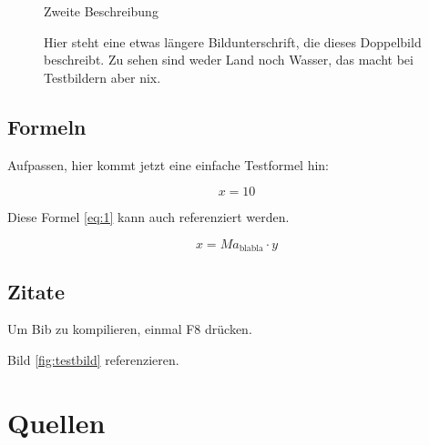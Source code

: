\documentclass[
12pt, %
toc=listofnumbered, %
toc=chapterentrydotfill, %
numbers=noenddot, %
captions=tableheading, %
]{scrreprt}
\let\Oldsection\section
\renewcommand{\section}{\FloatBarrier\Oldsection}
\begin{document}
\begin{figure}
\begin{minipage}[b]{.4\linewidth}
		\caption{Zweite Beschreibung}
		\label{fig:testbild_klein_rechts}
	\end{minipage}
\caption*{Hier steht eine etwas längere Bildunterschrift, die dieses Doppelbild beschreibt. Zu sehen sind weder Land noch Wasser, das macht bei Testbildern aber nix.}
\end{figure}

\section{Formeln}

Aufpassen, hier kommt jetzt eine einfache Testformel hin:

\begin{equation}
\label{eq:1}
x=10
\end{equation}

Diese Formel \autoref{eq:1} kann auch referenziert werden.

\begin{equation}
x=Ma_{\mathrm{blabla}} \cdot y
\end{equation}

\section{Zitate}

Um Bib zu kompilieren, einmal F8 drücken.

Bild \autoref{fig:testbild} referenzieren.

\chapter{Quellen}
\end{document}
